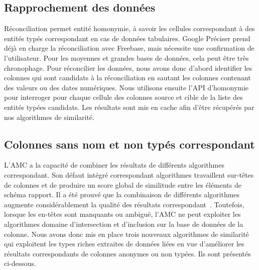 \documentclass[a4paper,11pt,twoside]{ThesisStyle}
\begin{document}
\subsection{Rapprochement des données}
Réconciliation permet entité homonymie, à savoir les cellules correspondant à des entités typés correspondant en cas de données tabulaires. Google Préciser prend déjà en charge la réconciliation avec Freebase, mais nécessite une confirmation de l'utilisateur. Pour les moyennes et grandes bases de données, cela peut être très chronophage. Pour réconcilier les données, nous avons donc d'abord identifier les colonnes qui sont candidats à la réconciliation en sautant les colonnes contenant des valeurs ou des dates numériques. Nous utilisons ensuite l'API d'homonymie pour interroger pour chaque cellule des colonnes source et cible de la liste des entités typées candidats. Les résultats sont mis en cache afin d'être récupérés par nos algorithmes de similarité.

\subsection{Colonnes sans nom et non typés correspondant}
L'AMC a la capacité de combiner les résultats de différents algorithmes correspondant. Son défaut intégré correspondant algorithmes travaillent sur-têtes de colonnes et de produire un score global de similitude entre les éléments de schéma rapport. Il a été prouvé que la combinaison de différents algorithmes augmente considérablement la qualité des résultats correspondant~\cite{Peukert:ICDE:12}\cite{conf/wise/StracciaT05}. Toutefois, lorsque les en-têtes sont manquants ou ambiguë, l'AMC ne peut exploiter les algorithmes domaine d'intersection et d'inclusion sur la base de données de la colonne. Nous avons donc mis en place trois nouveaux algorithmes de similarité qui exploitent les types riches extraites de données liées en vue d'améliorer les résultats correspondants de colonnes anonymes ou non typées. Ils sont présentés ci-dessous.
\end{document}
